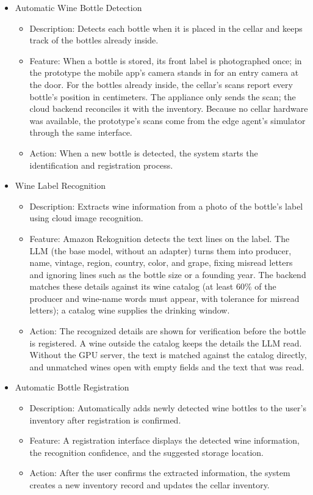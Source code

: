 \documentclass[conference]{IEEEtran}
\begin{document}
\begin{itemize}
    \item Automatic Wine Bottle Detection
    \begin{itemize}
        \item Description: Detects each bottle when it is placed in the cellar and keeps track of the bottles already inside.
        \item Feature: When a bottle is stored, its front label is photographed once; in the prototype the mobile app's camera stands in for an entry camera at the door. For the bottles already inside, the cellar's scans report every bottle's position in centimeters. The appliance only sends the scan; the cloud backend reconciles it with the inventory. Because no cellar hardware was available, the prototype's scans come from the edge agent's simulator through the same interface.
        \item Action: When a new bottle is detected, the system starts the identification and registration process.
    \end{itemize}

    \item Wine Label Recognition
    \begin{itemize}
        \item Description: Extracts wine information from a photo of the bottle's label using cloud image recognition.
        \item Feature: Amazon Rekognition detects the text lines on the label. The LLM (the base model, without an adapter) turns them into producer, name, vintage, region, country, color, and grape, fixing misread letters and ignoring lines such as the bottle size or a founding year. The backend matches these details against its wine catalog (at least 60\% of the producer and wine-name words must appear, with tolerance for misread letters); a catalog wine supplies the drinking window.
        \item Action: The recognized details are shown for verification before the bottle is registered. A wine outside the catalog keeps the details the LLM read. Without the GPU server, the text is matched against the catalog directly, and unmatched wines open with empty fields and the text that was read.
    \end{itemize}

    \item Automatic Bottle Registration
    \begin{itemize}
        \item Description: Automatically adds newly detected wine bottles to the user's inventory after registration is confirmed.
        \item Feature: A registration interface displays the detected wine information, the recognition confidence, and the suggested storage location.
        \item Action: After the user confirms the extracted information, the system creates a new inventory record and updates the cellar inventory.
    \end{itemize}


\end{itemize}
\end{document}
